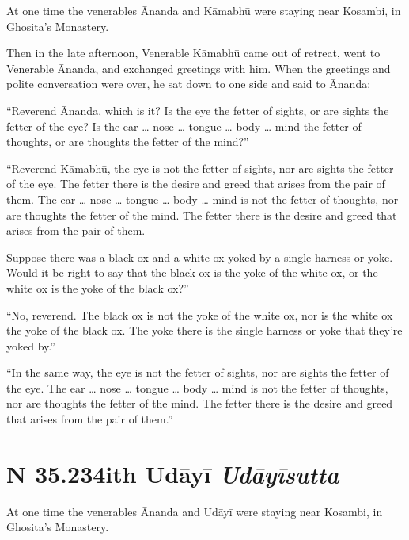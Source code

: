 \documentclass[12pt,openany]{book}%
\newcommand*{\suttatitleacronym}[1]{\smaller[2]{#1}\vspace*{.3em}}
\newcommand*{\suttatitletranslation}[1]{\linebreak{#1}}
\newcommand*{\suttatitleroot}[1]{\linebreak\smaller[2]\itshape{#1}}
\newcommand*{\tocacronym}[1]{\hspace*{-3.3em}{#1}\quad}
\newcommand*{\toctranslation}[1]{#1}
\newcommand*{\tocroot}[1]{(\textit{#1})}
\begin{document}
At one time the venerables Ānanda and \textsanskrit{Kāmabhū} were staying near Kosambi, in Ghosita’s Monastery. 

Then in the late afternoon, Venerable \textsanskrit{Kāmabhū} came out of retreat, went to Venerable Ānanda, and exchanged greetings with him. When the greetings and polite conversation were over, he sat down to one side and said to Ānanda: 

“Reverend Ānanda, which is it? Is the eye the fetter of sights, or are sights the fetter of the eye? Is the ear … nose … tongue … body … mind the fetter of thoughts, or are thoughts the fetter of the mind?” 

“Reverend \textsanskrit{Kāmabhū}, the eye is not the fetter of sights, nor are sights the fetter of the eye. The fetter there is the desire and greed that arises from the pair of them. The ear … nose … tongue … body … mind is not the fetter of thoughts, nor are thoughts the fetter of the mind. The fetter there is the desire and greed that arises from the pair of them. 

Suppose there was a black ox and a white ox yoked by a single harness or yoke. Would it be right to say that the black ox is the yoke of the white ox, or the white ox is the yoke of the black ox?” 

“No, reverend. The black ox is not the yoke of the white ox, nor is the white ox the yoke of the black ox. The yoke there is the single harness or yoke that they’re yoked by.” 

“In the same way, the eye is not the fetter of sights, nor are sights the fetter of the eye. The ear … nose … tongue … body … mind is not the fetter of thoughts, nor are thoughts the fetter of the mind. The fetter there is the desire and greed that arises from the pair of them.” 

%
\section*{{\suttatitleacronym SN 35.234}{\suttatitletranslation With Udāyī }{\suttatitleroot Udāyīsutta}}
\addcontentsline{toc}{section}{\tocacronym{SN 35.234} \toctranslation{With Udāyī } \tocroot{Udāyīsutta}}

At one time the venerables Ānanda and \textsanskrit{Udāyī} were staying near Kosambi, in Ghosita’s Monastery. 
\end{document}
